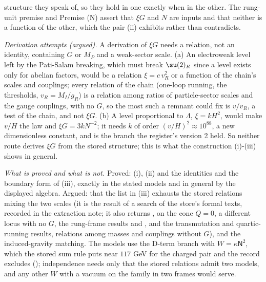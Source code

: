 structure they speak of, so they hold in one exactly when in the other. The rung-unit premise and Premise (N) assert that $\xi G$ and $N$ are inputs and that neither is a function of the other, which the pair (ii) exhibits rather than contradicts.

\emph{Derivation attempts (argued).} A derivation of $\xi G$ needs a relation, not an identity, containing $G$ or $M_{P}$ and a weak-sector scale. (a) An electroweak level left by the Pati-Salam breaking, which must break $\su(2)_{R}$ since a level exists only for abelian factors, would be a relation $\xi = c\,v_{R}^{2}$ or a function of the chain's scales and couplings; every relation of the chain (one-loop running, the thresholds, $v_{R} = M_{I}/g_{R}$) is a relation among ratios of particle-sector scales and the gauge couplings, with no $G$, so the most such a remnant could fix is $v/v_{R}$, a test of the chain, and not $\xi G$. (b) A level proportional to $\Lambda$, $\xi = kH^{2}$, would make $v/H$ the law and $\xi G = 3kN^{-2}$; it needs $k$ of order $(v/H)^{2} \approx 10^{88}$, a new dimensionless constant, and is the branch the register's version 2 held. So neither route derives $\xi G$ from the stored structure; this is what the construction (i)-(iii) shows in general.

\emph{What is proved and what is not.} Proved: (i), (ii) and the identities and the boundary form of (iii), exactly in the stated models and in general by the displayed algebra. Argued: that the list in (iii) exhausts the stored relations mixing the two scales (it is the result of a search of the store's formal texts, recorded in the extraction note; it also returns , on the cone $Q = 0$, a different locus with no $G$, the rung-frame results  and , and the transmutation and quartic-running results, relations among masses and couplings without $G$), and the induced-gravity matching. The models use the D-term branch with $W = \kappa\mathsf{N}^{2}$, which the stored sum rule puts near $117$ GeV for the charged pair and the record excludes (); independence needs only that the stored relations admit two models, and any other $W$ with a vacuum on the family in two frames would serve.
